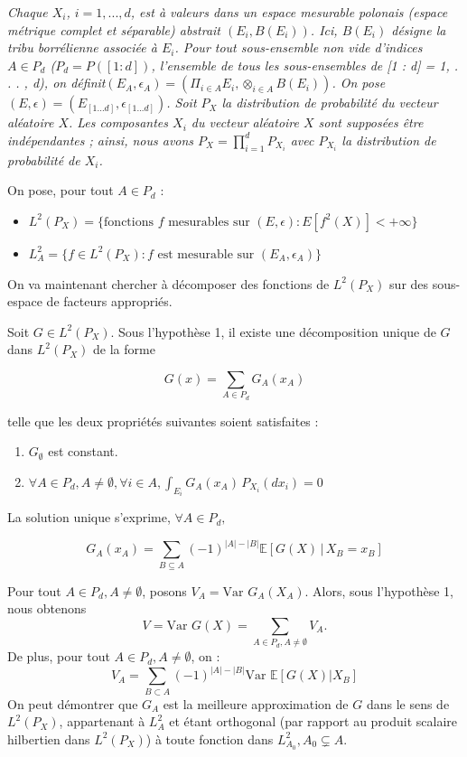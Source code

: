 \documentclass[
]{article}
\providecommand{\tightlist}{%
  \setlength{\itemsep}{0pt}\setlength{\parskip}{0pt}}
\begin{document}
\textit{Chaque \(X_i\), \(i = 1, . . . , d\), est à valeurs dans un espace mesurable polonais (espace métrique complet et séparable) abstrait \((E_i, B(E_i))\). Ici, \(B(E_i)\) désigne la tribu borrélienne associée à \(E_i\). Pour tout sous-ensemble non vide d'indices \(A \in P_d\) (\(P_d = P([1 : d])\), l'ensemble de tous les sous-ensembles de [1 : d] = {1, . . . , d}), on définit\((E_A, \epsilon_A) = (\Pi_{i\in A} E_i, \otimes_{i\in A} B(E_i))\). On pose \((E,\epsilon)=(E_{[1...d]},\epsilon_{[1...d]})\). Soit \(P_X\) la distribution de probabilité du vecteur aléatoire \(X\). Les composantes \(X_i\) du vecteur aléatoire \(X\) sont supposées être indépendantes ; ainsi, nous avons \(P_X = \prod_{i=1}^{d} P_{X_i}\) avec \(P_{X_i}\) la distribution de probabilité de \(X_i\).}

On pose, pour tout \(A \in P_{d}\) :

\begin{itemize}
  \item \(L^2(P_X) = \{\text{fonctions }f \text{ mesurables sur } (E, \epsilon) : E[f^2(X)] < +\infty\}\)
  \item \(L^2_A = \{f \in L^2(P_X) : f \text{ est mesurable sur }(E_A, \epsilon_A)\}\) 
\end{itemize}

On va maintenant chercher à décomposer des fonctions de \(L^2(P_X)\) sur
des sous-espace de facteurs appropriés.

Soit \(G \in L^2(P_X)\). Sous l'hypothèse 1, il existe une décomposition
unique de \(G\) dans \(L^2(P_X)\) de la forme

\[
G(x) = \sum_{A \in P_d} G_A(x_A)
\]

telle que les deux propriétés suivantes soient satisfaites :

\begin{enumerate}
\def\labelenumi{\arabic{enumi}.}
\tightlist
\item
  \(G_\emptyset\) est constant.
\item
  \(\forall A \in P_d, A \neq \emptyset, \forall i \in A, \int_{E_i} G_A(x_A) \, P_{X_i}(dx_i) = 0\)
\end{enumerate}

La solution unique s'exprime, \(\forall A \in P_{d},\)

\[
G_A(x_A) = \sum_{B \subseteq A} (-1)^{|A| - |B|} \mathbb{E}[G(X) \,|\, X_B = x_B]
\]

Pour tout \(A \in P_d, A \neq \emptyset\), posons
\(V_A = \text{Var } G_A(X_A)\). Alors, sous l'hypothèse 1, nous obtenons
\[
V = \text{Var } G(X) = \sum_{A \in P_d, A \neq \emptyset} V_A.
\] De plus, pour tout \(A \in P_d, A \neq \emptyset\), on : \[
V_A = \sum_{B \subset A} (-1)^{|A| - |B|} \text{Var } \mathbb{E}[G(X)|X_B]
\] On peut démontrer que \(G_A\) est la meilleure approximation de \(G\)
dans le sens de \(L^2(P_X)\), appartenant à \(L^2_A\) et étant
orthogonal (par rapport au produit scalaire hilbertien dans
\(L^2(P_X)\)) à toute fonction dans \(L^2_{A_0}, A_0 \subsetneq A\).
\end{document}
